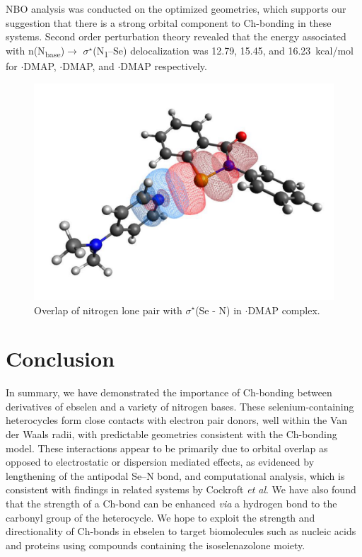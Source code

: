 NBO analysis was conducted on the optimized geometries, which supports our suggestion that there is a strong orbital component to Ch-bonding in these systems.
Second order perturbation theory revealed that the energy associated with n(N\textsubscript{base})$\rightarrow$ $\sigma^{\star}$(N\textsubscript{1}--Se) delocalization was 12.79, 15.45, and 16.23~kcal/mol for $\cdot$DMAP, $\cdot$DMAP, and $\cdot$DMAP respectively.

\begin{figure}
  \centering
  \includegraphics[width=0.6\linewidth]{fig/phenyl-dmap-overlap.pdf}
  \caption[Orbital overlap for $\cdot$DMAP.]{Overlap of nitrogen lone pair with $\sigma^{\star}$(Se - N) in $\cdot$DMAP complex.}
  \label{fig:phenyl-dmap-overlap}
\end{figure}

\section{Conclusion}
In summary, we have demonstrated the importance of Ch-bonding between derivatives of ebselen  and a variety of nitrogen bases.
These selenium-containing heterocycles form close contacts with electron pair donors, well within the Van der Waals radii, with predictable geometries consistent with the Ch-bonding model.
These interactions appear to be primarily due to orbital overlap as opposed to electrostatic or dispersion mediated effects, as evidenced by lengthening of the antipodal Se--N bond, and computational analysis, which is consistent with findings in related systems by Cockroft \emph{et al}.\autocite{Pascoe2017}
We have also found that the strength of a Ch-bond can be enhanced \emph{via} a hydrogen bond to the carbonyl group of the heterocycle.
We hope to exploit the strength and directionality of Ch-bonds in ebselen to target biomolecules such as nucleic acids and proteins using compounds containing the isoselenazolone moiety.

